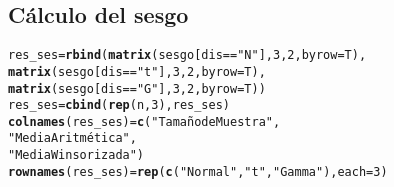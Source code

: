 \documentclass{article}\usepackage[]{graphicx}\usepackage[]{color}
\makeatletter
\newcommand{\hlnum}[1]{\textcolor[rgb]{0.686,0.059,0.569}{#1}}%
\newcommand{\hlstr}[1]{\textcolor[rgb]{0.192,0.494,0.8}{#1}}%
\newcommand{\hlopt}[1]{\textcolor[rgb]{0,0,0}{#1}}%
\newcommand{\hlstd}[1]{\textcolor[rgb]{0.345,0.345,0.345}{#1}}%
\newcommand{\hlkwb}[1]{\textcolor[rgb]{0.69,0.353,0.396}{#1}}%
\newcommand{\hlkwc}[1]{\textcolor[rgb]{0.333,0.667,0.333}{#1}}%
\newcommand{\hlkwd}[1]{\textcolor[rgb]{0.737,0.353,0.396}{\textbf{#1}}}%
\newenvironment{kframe}{%
 \def\at@end@of@kframe{}%
 \ifinner\ifhmode%
  \def\at@end@of@kframe{\end{minipage}}%
  \begin{minipage}{\columnwidth}%
 \fi\fi%
 \def\FrameCommand##1{\hskip\@totalleftmargin \hskip-\fboxsep
 \colorbox{shadecolor}{##1}\hskip-\fboxsep
     \hskip-\linewidth \hskip-\@totalleftmargin \hskip\columnwidth}%
 \MakeFramed {\advance\hsize-\width
   \@totalleftmargin\z@ \linewidth\hsize
   \@setminipage}}%
 {\par\unskip\endMakeFramed%
 \at@end@of@kframe}
\newenvironment{knitrout}{}{} %
\makeatother
\begin{document}
\subsection*{Cálculo del sesgo}

\begin{knitrout}
\color{fgcolor}\begin{kframe}
\begin{alltt}
\hlstd{res_ses} \hlkwb{=} \hlkwd{rbind}\hlstd{(}\hlkwd{matrix}\hlstd{(sesgo[dis}\hlopt{==}\hlstr{"N"}\hlstd{],}\hlnum{3}\hlstd{,}\hlnum{2}\hlstd{,}\hlkwc{byrow}\hlstd{=T),}
                \hlkwd{matrix}\hlstd{(sesgo[dis}\hlopt{==}\hlstr{"t"}\hlstd{],}\hlnum{3}\hlstd{,}\hlnum{2}\hlstd{,}\hlkwc{byrow}\hlstd{=T),}
                \hlkwd{matrix}\hlstd{(sesgo[dis}\hlopt{==}\hlstr{"G"}\hlstd{],}\hlnum{3}\hlstd{,}\hlnum{2}\hlstd{,}\hlkwc{byrow}\hlstd{=T))}
\hlstd{res_ses} \hlkwb{=} \hlkwd{cbind}\hlstd{(}\hlkwd{rep}\hlstd{(n,}\hlnum{3}\hlstd{),res_ses)}
\hlkwd{colnames}\hlstd{(res_ses)} \hlkwb{=} \hlkwd{c}\hlstd{(}\hlstr{"Tamaño de Muestra"}\hlstd{,}
                      \hlstr{"Media Aritmética"}\hlstd{,}
                      \hlstr{"Media Winsorizada"}\hlstd{)}
\hlkwd{rownames}\hlstd{(res_ses)} \hlkwb{=} \hlkwd{rep}\hlstd{(}\hlkwd{c}\hlstd{(}\hlstr{"Normal"}\hlstd{,}\hlstr{"t"}\hlstd{,}\hlstr{"Gamma"}\hlstd{),}\hlkwc{each} \hlstd{=} \hlnum{3}\hlstd{)}
\end{alltt}
\end{kframe}
\end{knitrout}
\end{document}
